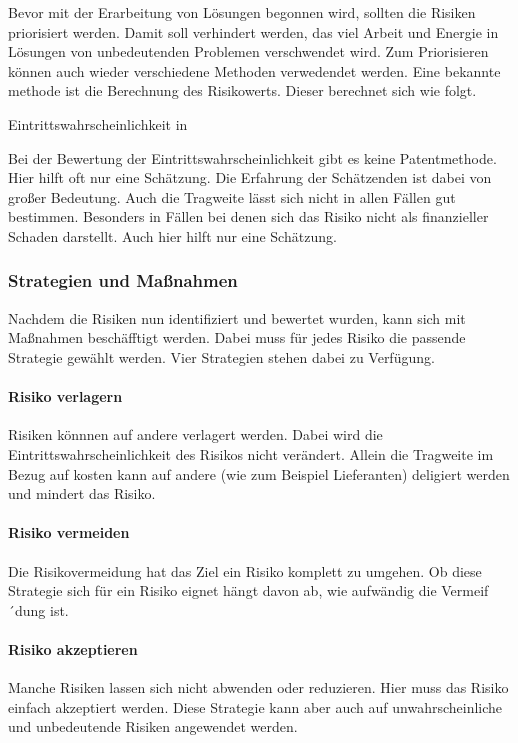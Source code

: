 \documentclass[ThesisDJ.tex]{subfiles}
\begin{document}
Bevor mit der Erarbeitung von Lösungen begonnen wird, sollten die Risiken priorisiert werden. Damit soll verhindert werden, das viel Arbeit und Energie in Lösungen von unbedeutenden Problemen verschwendet wird.  Zum Priorisieren können auch wieder verschiedene Methoden verwedendet werden. Eine bekannte methode ist die Berechnung des Risikowerts. Dieser berechnet sich wie folgt.

Eintrittswahrscheinlichkeit in %

Bei der Bewertung der Eintrittswahrscheinlichkeit gibt es keine Patentmethode. Hier hilft oft nur eine Schätzung. Die Erfahrung der Schätzenden ist dabei von großer Bedeutung. 
Auch die Tragweite lässt sich nicht in allen Fällen gut bestimmen. Besonders in Fällen bei denen sich das Risiko nicht als finanzieller Schaden darstellt. Auch hier hilft nur eine Schätzung.

\subsubsection{Strategien und Maßnahmen}
Nachdem die Risiken nun identifiziert und bewertet wurden, kann sich mit Maßnahmen beschäfftigt werden. 
Dabei muss für jedes Risiko die passende Strategie gewählt werden. Vier Strategien stehen dabei zu Verfügung.

\paragraph{Risiko verlagern}
Risiken könnnen auf andere verlagert werden. Dabei wird die Eintrittswahrscheinlichkeit des Risikos nicht verändert. Allein die Tragweite im Bezug auf kosten kann auf andere (wie zum Beispiel Lieferanten) deligiert werden und mindert das Risiko.


\paragraph{Risiko vermeiden}
Die Risikovermeidung hat das Ziel ein Risiko komplett zu umgehen. Ob diese Strategie sich für ein Risiko eignet hängt davon ab, wie aufwändig die Vermeif´dung ist.

\paragraph{Risiko akzeptieren}
Manche Risiken lassen sich nicht abwenden oder reduzieren. Hier muss das Risiko einfach akzeptiert werden. Diese Strategie kann aber auch auf unwahrscheinliche und unbedeutende Risiken angewendet werden.
\end{document}

